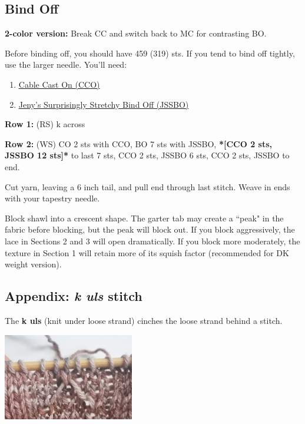 \documentclass[12pt]{article}
\newcommand{\rowDir}[1]{\textbf{#1:}} %
\renewcommand{\repeat}[1]{\textbf{*[#1]*}} %
\newenvironment{frnote}
    {%
    	\setlength{\FrameRule}{1.5pt}
    	\def\FrameCommand{\fboxrule=\FrameRule\fboxsep=\FrameSep \fcolorbox{framecolor}{shadecolor}}
    	\MakeFramed {\FrameRestore}}
    {\setlength{\FrameRule}{1pt}
	\endMakeFramed}
\newenvironment{unframed}
    {%
	\setlength{\parindent}{-2em}
	\begin{addmargin}[2em]{0pt}}
    {\end{addmargin}
	\setlength{\parindent}{0em}}
\begin{document}
\begin{multicols}{2}
\subsection*{Bind Off}
\begin{frnote}
\textbf{2-color version:} Break CC and switch back to MC for contrasting BO.
\end{frnote}

Before binding off, you should have 459 (319) sts. If you tend to bind off tightly, use the larger needle. You'll need:
\begin{enumerate}
\item \href{https://www.purlsoho.com/create/cable-cast-on/}{\underline{Cable Cast On} (CCO)}
\vspace{-0.5em}
\item \href{http://www.knitty.com/ISSUEfall09/FEATjssbo.php}{\underline{Jeny's Surprisingly Stretchy Bind Off} (JSSBO)}
\end{enumerate}

\begin{unframed}
\hspace{-2em}\rowDir{Row 1} (RS) k across

\rowDir{Row 2} (WS) CO 2 sts with CCO, BO 7 sts with JSSBO, \repeat{CCO 2 sts, JSSBO 12 sts} to last 7 sts, CCO 2 sts, JSSBO 6 sts, CCO 2  sts, JSSBO to end.
\end{unframed}

\vspace{1em}

Cut yarn, leaving a 6 inch tail, and pull end through last stitch. Weave in ends with your tapestry needle. 

\vspace{1em}
Block shawl into a crescent shape. The garter tab may create a ``peak" in the fabric before blocking, but the peak will block out. If you block aggressively, the lace in Sections 2 and 3 will open dramatically. If you block more moderately, the texture in Section 1 will retain more of its squish factor (recommended for DK weight version).

\subsection*{Appendix: \emph{k uls} stitch}

The \textbf{k uls} (knit under loose strand) cinches the loose strand behind a stitch.

\begin{center}
\includegraphics[height=1.5in]{end.jpg}
\end{center}


\end{multicols}
\end{document}
